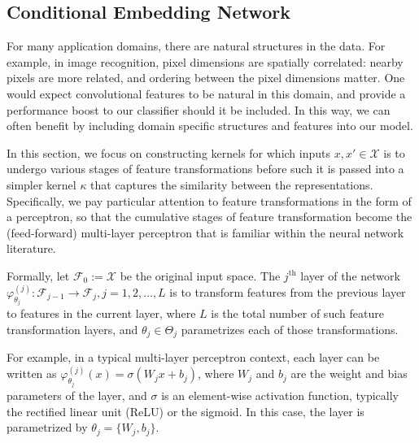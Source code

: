 \documentclass[runningheads, envcountsame, a4paper]{llncs}
\begin{document}
		\subsection{Conditional Embedding Network}
		\label{app:conditional_embedding_network}
	
			For many application domains, there are natural structures in the data. For example, in image recognition, pixel dimensions are spatially correlated: nearby pixels are more related, and ordering between the pixel dimensions matter. One would expect convolutional features \citep{lecun1998gradient} to be natural in this domain, and provide a performance boost to our classifier should it be included. In this way, we can often benefit by including domain specific structures and features into our model.
			
			In this section, we focus on constructing kernels for which inputs $x, x' \in \mathcal{X}$ is to undergo various stages of feature transformations before such it is passed into a simpler kernel $\kappa$ that captures the similarity between the representations. Specifically, we pay particular attention to feature transformations in the form of a perceptron, so that the cumulative stages of feature transformation become the (feed-forward) multi-layer perceptron that is familiar within the neural network literature.
			
			Formally, let $\mathcal{F}_{0} := \mathcal{X}$ be the original input space. The $j^{\mathrm{th}}$ layer of the network $\varphi^{(j)}_{\theta_{j}} : \mathcal{F}_{j - 1} \to \mathcal{F}_{j}, j = 1, 2, \dots, L$ is to transform features from the previous layer to features in the current layer, where $L$ is the total number of such feature transformation layers, and $\theta_{j} \in \Theta_{j}$ parametrizes each of those transformations.
			
			For example, in a typical multi-layer perceptron context, each layer can be written as $\varphi^{(j)}_{\theta_{j}}(x) = \sigma(W_{j} x + b_{j})$, where $W_{j}$ and $b_{j}$ are the weight and bias parameters of the layer, and $\sigma$ is an element-wise activation function, typically the rectified linear unit (ReLU) or the sigmoid. In this case, the layer is parametrized by $\theta_{j} = \{W_{j}, b_{j}\}$.
			
\end{document}
